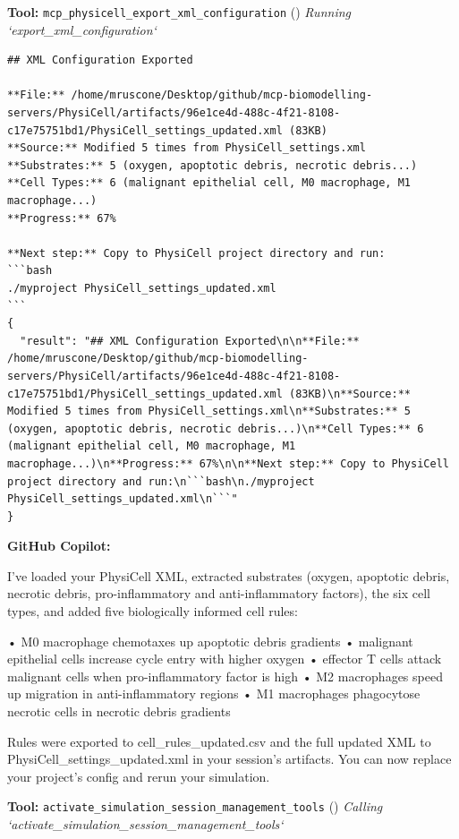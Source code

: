 \documentclass[11pt,a4paper]{article}
\begin{document}
\begin{toolokbox}
\textbf{Tool:} \texttt{mcp\_physicell\_export\_xml\_configuration} (\checkmark)
\textit{Running `export\_xml\_configuration`}
\begin{lstlisting}
## XML Configuration Exported

**File:** /home/mruscone/Desktop/github/mcp-biomodelling-servers/PhysiCell/artifacts/96e1ce4d-488c-4f21-8108-c17e75751bd1/PhysiCell_settings_updated.xml (83KB)
**Source:** Modified 5 times from PhysiCell_settings.xml
**Substrates:** 5 (oxygen, apoptotic debris, necrotic debris...)
**Cell Types:** 6 (malignant epithelial cell, M0 macrophage, M1 macrophage...)
**Progress:** 67%

**Next step:** Copy to PhysiCell project directory and run:
```bash
./myproject PhysiCell_settings_updated.xml
```
{
  "result": "## XML Configuration Exported\n\n**File:** /home/mruscone/Desktop/github/mcp-biomodelling-servers/PhysiCell/artifacts/96e1ce4d-488c-4f21-8108-c17e75751bd1/PhysiCell_settings_updated.xml (83KB)\n**Source:** Modified 5 times from PhysiCell_settings.xml\n**Substrates:** 5 (oxygen, apoptotic debris, necrotic debris...)\n**Cell Types:** 6 (malignant epithelial cell, M0 macrophage, M1 macrophage...)\n**Progress:** 67%\n\n**Next step:** Copy to PhysiCell project directory and run:\n```bash\n./myproject PhysiCell_settings_updated.xml\n```"
}
\end{lstlisting}
\end{toolokbox}
\begin{copilotbox}
\textbf{GitHub Copilot:}

I’ve loaded your PhysiCell XML, extracted substrates (oxygen, apoptotic debris, necrotic debris, pro-inflammatory and anti-inflammatory factors), the six cell types, and added five biologically informed cell rules:

• M0 macrophage chemotaxes up apoptotic debris gradients  
• malignant epithelial cells increase cycle entry with higher oxygen  
• effector T cells attack malignant cells when pro-inflammatory factor is high  
• M2 macrophages speed up migration in anti-inflammatory regions  
• M1 macrophages phagocytose necrotic cells in necrotic debris gradients

Rules were exported to cell\_rules\_updated.csv and the full updated XML to PhysiCell\_settings\_updated.xml in your session’s artifacts. You can now replace your project’s config and rerun your simulation.

\end{copilotbox}
\begin{toolokbox}
\textbf{Tool:} \texttt{activate\_simulation\_session\_management\_tools} (\checkmark)
\textit{Calling `activate\_simulation\_session\_management\_tools`}
\end{toolokbox}
\end{document}
